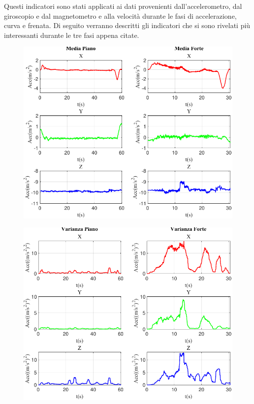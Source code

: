 \documentclass[class=article]{standalone}
\begin{document}
	
	Questi indicatori sono stati applicati ai dati provenienti dall'accelerometro, dal giroscopio e dal magnetometro e alla velocità durante le fasi di accelerazione, curva e frenata. Di seguito verranno descritti gli indicatori che si sono rivelati più interessanti durante le tre fasi appena citate.
	
	\begin{center}
		\begin{figure}[h]
			\centering\includegraphics[width=.9\textwidth]{img/lungaFP/Acc/Media}
			\caption[]{}
			\label{fig:AccMedia_lungaFP}
		\end{figure}
	\end{center}
	
	\begin{center}
		\begin{figure}[h]
			\centering\includegraphics[width=.9\textwidth]{img/lungaFP/Acc/Varianza}
			\caption[]{}
			\label{fig:AccVar_lungaFP}
		\end{figure}
	\end{center}
	
\end{document}
